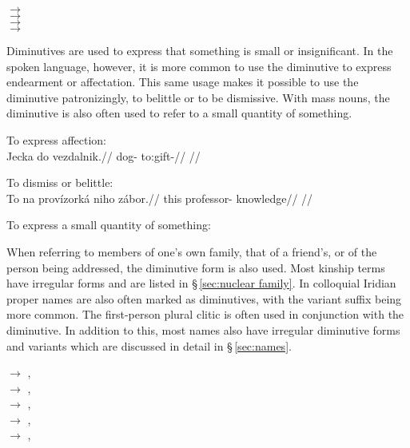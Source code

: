 \ex
{} $\rightarrow$ \\
 $\rightarrow$  \\
 $\rightarrow$  \\
 $\rightarrow$  
\xe

Diminutives are used to express that something is small or insignificant. In the spoken language, however, it is more common to use the diminutive to express endearment or affectation. This same usage makes it possible to use the diminutive patronizingly, to belittle or to be dismissive. With mass nouns, the diminutive is also often used to refer to a small quantity of something.

\pex
\a To express affection:\\
\begingl
\gla Jecka do vezdalnik.//
\glb dog-  to:gift-//
\glft {}//
\endgl

\a To dismiss or belittle:\\
\begingl
\gla To na provízorká niho zábor.//
\glb this  professor-  knowledge//
\glft {}//
\endgl

\a To express a small quantity of something:
\xe

When referring to members of one's own family, that of a friend's, or of the person being addressed, the diminutive form is also used. Most kinship terms have irregular forms and are listed in \S\,\ref{sec:nuclear family}. In colloquial Iridian proper names are also often marked as diminutives, with the variant suffix  being more common. The first-person plural clitic  is often used in conjunction with the diminutive. In addition to this, most names also have irregular diminutive forms and variants which are discussed in detail in \S\,\ref{sec:names}.

\ex
{} $\rightarrow$ , \\
 $\rightarrow$ , \\
 $\rightarrow$ , \\
 $\rightarrow$ , \\
 $\rightarrow$ , 
\xe

